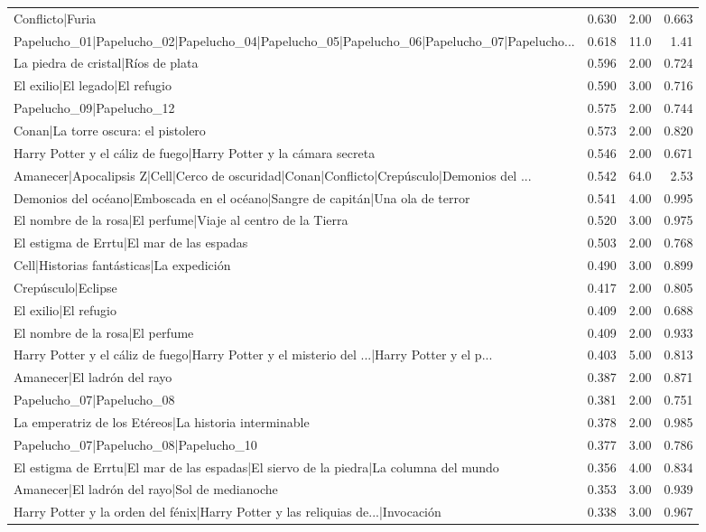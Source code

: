 \begin{table}[htbp]
\begin{tabular}{lrrr}
Conflicto|Furia & 0.630 & 2.00 & 0.663 \\
Papelucho\_01|Papelucho\_02|Papelucho\_04|Papelucho\_05|Papelucho\_06|Papelucho\_07|Papelucho... & 0.618 & 11.0 & 1.41 \\
La piedra de cristal|Ríos de plata & 0.596 & 2.00 & 0.724 \\
El exilio|El legado|El refugio & 0.590 & 3.00 & 0.716 \\
Papelucho\_09|Papelucho\_12 & 0.575 & 2.00 & 0.744 \\
Conan|La torre oscura: el pistolero & 0.573 & 2.00 & 0.820 \\
Harry Potter y el cáliz de fuego|Harry Potter y la cámara secreta & 0.546 & 2.00 & 0.671 \\
Amanecer|Apocalipsis Z|Cell|Cerco de oscuridad|Conan|Conflicto|Crepúsculo|Demonios del ... & 0.542 & 64.0 & 2.53 \\
Demonios del océano|Emboscada en el océano|Sangre de capitán|Una ola de terror & 0.541 & 4.00 & 0.995 \\
El nombre de la rosa|El perfume|Viaje al centro de la Tierra & 0.520 & 3.00 & 0.975 \\
El estigma de Errtu|El mar de las espadas & 0.503 & 2.00 & 0.768 \\
Cell|Historias fantásticas|La expedición & 0.490 & 3.00 & 0.899 \\
Crepúsculo|Eclipse & 0.417 & 2.00 & 0.805 \\
El exilio|El refugio & 0.409 & 2.00 & 0.688 \\
El nombre de la rosa|El perfume & 0.409 & 2.00 & 0.933 \\
Harry Potter y el cáliz de fuego|Harry Potter y el misterio del ...|Harry Potter y el p... & 0.403 & 5.00 & 0.813 \\
Amanecer|El ladrón del rayo & 0.387 & 2.00 & 0.871 \\
Papelucho\_07|Papelucho\_08 & 0.381 & 2.00 & 0.751 \\
La emperatriz de los Etéreos|La historia interminable & 0.378 & 2.00 & 0.985 \\
Papelucho\_07|Papelucho\_08|Papelucho\_10 & 0.377 & 3.00 & 0.786 \\
El estigma de Errtu|El mar de las espadas|El siervo de la piedra|La columna del mundo & 0.356 & 4.00 & 0.834 \\
Amanecer|El ladrón del rayo|Sol de medianoche & 0.353 & 3.00 & 0.939 \\
Harry Potter y la orden del fénix|Harry Potter y las reliquias de...|Invocación & 0.338 & 3.00 & 0.967 \\

\end{tabular}
\end{table}

